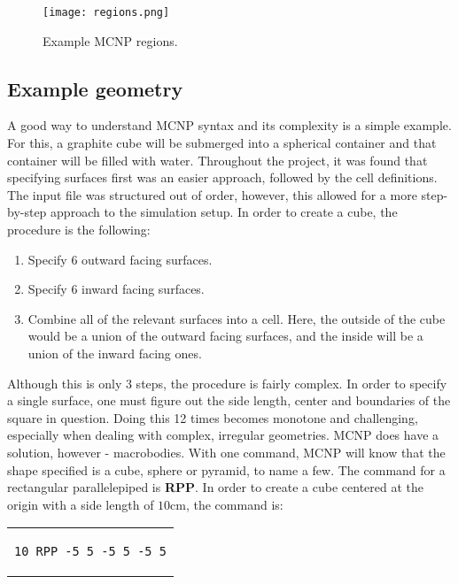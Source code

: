 \begin{figure}[!htbp]
\caption{Example MCNP regions.}
\label{fig:regions}
\centering
\texttt{[image: regions.png]}
\end{figure}

\subsection{Example geometry}

A good way to understand MCNP syntax and its complexity is a simple example. For this, a graphite cube will be submerged into a spherical container and that container will be filled with water. Throughout the project, it was found that specifying surfaces first was an easier approach, followed by the cell definitions. The input file was structured out of order, however, this allowed for a more step-by-step approach to the simulation setup. In order to create a cube, the procedure is the following:

\begin{enumerate}
	\item Specify 6 outward facing surfaces.
	\item Specify 6 inward facing surfaces.
	\item Combine all of the relevant surfaces into a cell. Here, the outside of the cube would be a union of the outward facing surfaces, and the inside will be a union of the inward facing ones.
\end{enumerate}

Although this is only 3 steps, the procedure is fairly complex. In order to specify a single surface, one must figure out the side length, center and boundaries of the square in question. Doing this 12 times becomes monotone and challenging, especially when dealing with complex, irregular geometries. MCNP does have a solution, however - macrobodies. With one command, MCNP will know that the shape specified is a cube, sphere or pyramid, to name a few. The command for a rectangular parallelepiped is \textbf{RPP}. In order to create a cube centered at the origin with a side length of $10$cm, the command is:

\begin{center}
\begin{tabular}{c}
\begin{lstlisting}
10 RPP -5 5 -5 5 -5 5
\end{lstlisting}
\end{tabular}
\end{center}

